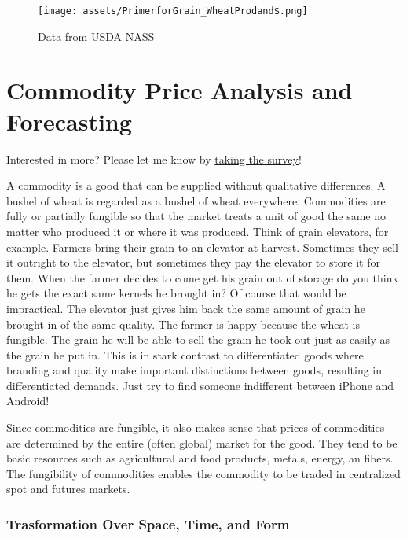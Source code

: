 \documentclass[
  letterpaper,
  DIV=11,
  numbers=noendperiod]{scrreprt}
\begin{document}
\begin{figure}

{\centering \texttt{[image: assets/PrimerforGrain\_WheatProdand\$.png]}

}

\caption{Data from USDA NASS}

\end{figure}


\hypertarget{commodity-price-analysis-and-forecasting}{%
\chapter{Commodity Price Analysis and
Forecasting}\label{commodity-price-analysis-and-forecasting}}

{Interested in more? Please let me know by}
\href{https://forms.gle/Q3VByCQZHjfQSy9D7}{taking the survey}!

A commodity is a good that can be supplied without qualitative
differences. A bushel of wheat is regarded as a bushel of wheat
everywhere. Commodities are fully or partially fungible so that the
market treats a unit of good the same no matter who produced it or where
it was produced. Think of grain elevators, for example. Farmers bring
their grain to an elevator at harvest. Sometimes they sell it outright
to the elevator, but sometimes they pay the elevator to store it for
them. When the farmer decides to come get his grain out of storage do
you think he gets the exact same kernels he brought in? Of course that
would be impractical. The elevator just gives him back the same amount
of grain he brought in of the same quality. The farmer is happy because
the wheat is fungible. The grain he will be able to sell the grain he
took out just as easily as the grain he put in. This is in stark
contrast to differentiated goods where branding and quality make
important distinctions between goods, resulting in differentiated
demands. Just try to find someone indifferent between iPhone and
Android!

Since commodities are fungible, it also makes sense that prices of
commodities are determined by the entire (often global) market for the
good. They tend to be basic resources such as agricultural and food
products, metals, energy, an fibers. The fungibility of commodities
enables the commodity to be traded in centralized spot and futures
markets.

\hypertarget{trasformation-over-space-time-and-form}{%
\subsection{Trasformation Over Space, Time, and
Form}\label{trasformation-over-space-time-and-form}}
\end{document}
